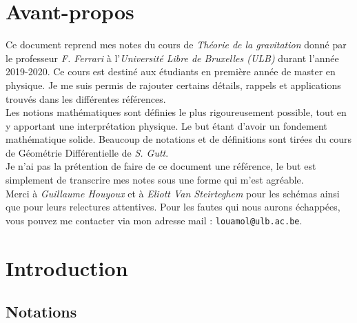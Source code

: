 \documentclass[a4paper,11pt]{report}
\begin{document}


\nocite{weinberg}
\nocite{wheeler}
\nocite{hawking}
\nocite{hartle}
\nocite{price}
\nocite{nakahara}
\nocite{wald}
\nocite{lee}
\nocite{gutt}

\chapter*{Avant-propos}

    Ce document reprend mes notes du cours de \textit{Théorie de la gravitation} donné par le professeur \textit{F. Ferrari} à l'\textit{Université Libre de Bruxelles (ULB)} durant l'année 2019-2020. Ce cours est destiné aux étudiants en première année de master en physique. Je me suis permis de rajouter certains détails, rappels et applications trouvés dans les différentes références.\\
    
    Les notions mathématiques sont définies le plus rigoureusement possible, tout en y apportant une interprétation physique. Le but étant d'avoir un fondement mathématique solide. Beaucoup de notations et de définitions sont tirées du cours de Géométrie Différentielle de \textit{S. Gutt}. \\
    
    Je n'ai pas la prétention de faire de ce document une référence, le but est simplement de transcrire mes notes sous une forme qui m'est agréable.\\
    
    Merci à \textit{Guillaume Houyoux} et à \textit{Eliott Van Steirteghem} pour les schémas ainsi que pour leurs relectures attentives. Pour les fautes qui nous aurons échappées, vous pouvez me contacter via mon adresse mail : \verb?louamol@ulb.ac.be?.
    

\printbibliography[title=Références]

\pagebreak

\tableofcontents

\pagebreak

\chapter{Introduction}

    \section*{Notations}
    
\end{document}
